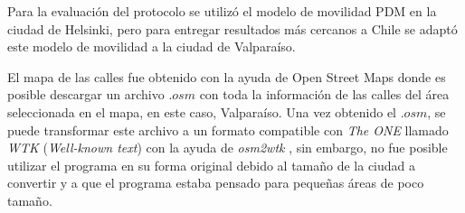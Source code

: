 Para la evaluación del protocolo se utilizó el modelo de movilidad PDM
\cite{uddin_post-disaster_2009} en la ciudad de Helsinki, pero para entregar
resultados más cercanos a Chile se adaptó este modelo de movilidad a la ciudad
de Valparaíso.

El mapa de las calles fue obtenido con la ayuda de Open Street Maps
\cite{open_street_map} donde es posible descargar un archivo $.osm$ con toda la
información de las calles del área seleccionada en el mapa, en este caso,
Valparaíso. Una vez obtenido el $.osm$, se puede transformar este archivo a un
formato compatible con \textit{The ONE} llamado \textit{WTK} (\textit{Well-known
text}) con la ayuda de \textit{osm2wtk} \cite{osm2wtk}, sin embargo, no fue
posible utilizar el programa en su forma original debido al tamaño de la ciudad
a convertir y a que el programa estaba pensado para pequeñas áreas de poco
tamaño.
